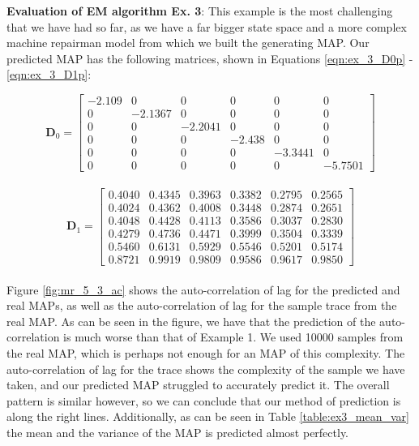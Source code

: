 \documentclass[a4paper,11pt,titlepage]{article}
\begin{document}
\textbf{Evaluation of EM algorithm Ex. 3}: This example is the most challenging that we have had so far, as we have a far bigger state space and a more complex machine repairman model from which we built the generating MAP. Our predicted MAP has the following matrices, shown in Equations \ref{eqn:ex_3_D0p} - \ref{eqn:ex_3_D1p}:

\begin{equation}
    \mathbf{D}_{0} = 
\begin{bmatrix}
-2.109 & 0 & 0 & 0 & 0 & 0\\
0 & -2.1367 & 0 & 0 & 0 & 0\\
0 & 0 & -2.2041 & 0 & 0 & 0\\
0 & 0 & 0 & -2.438 & 0 & 0\\
0 & 0 & 0 & 0 & -3.3441 & 0\\
0 & 0 & 0 & 0 & 0 & -5.7501
\end{bmatrix}
\label{eqn:ex_3_D0p}
\end{equation} \\

\begin{equation}
    \mathbf{D}_{1} = 
\begin{bmatrix}
 0.4040  &  0.4345  &  0.3963  &  0.3382  &  0.2795  &  0.2565\\
0.4024  &  0.4362  &  0.4008  &  0.3448  &  0.2874  &  0.2651\\
0.4048  &  0.4428  &  0.4113  &  0.3586  &  0.3037  &  0.2830\\
0.4279  &  0.4736  &  0.4471  &  0.3999  &  0.3504  &  0.3339\\
0.5460  &  0.6131  &  0.5929  &  0.5546  &  0.5201  &  0.5174\\
0.8721  &  0.9919  &  0.9809  &  0.9586  &  0.9617  &  0.9850
\end{bmatrix}
\label{eqn:ex_3_D1p}
\end{equation}  \\

Figure \ref{fig:mr_5_3_ac} shows the auto-correlation of lag for the predicted and real MAPs, as well as the auto-correlation of lag for the sample trace from the real MAP. As can be seen in the figure, we have that the prediction of the auto-correlation is much worse than that of Example 1. We used 10000 samples from the real MAP, which is perhaps not enough for an MAP of this complexity. The auto-correlation of lag for the trace shows the complexity of the sample we have taken, and our predicted MAP struggled to accurately predict it. The overall pattern is similar however, so we can conclude that our method of prediction is along the right lines. Additionally, as can be seen in Table \ref{table:ex3_mean_var} the mean and the variance of the MAP is predicted almost perfectly. \\
\end{document}
